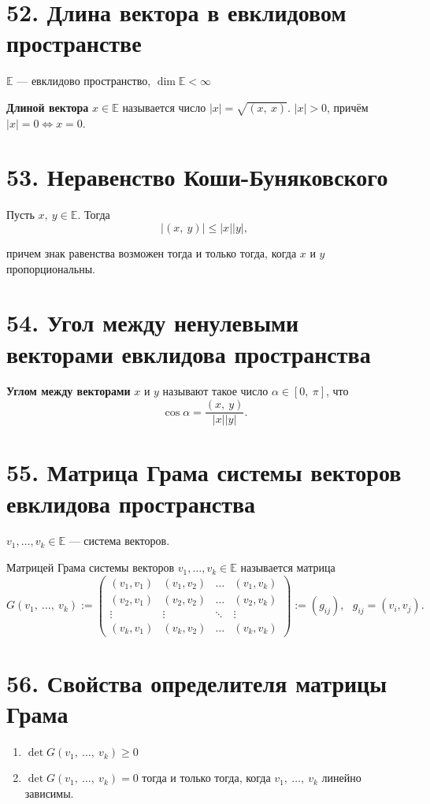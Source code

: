 \documentclass[a4paper, 12pt]{article}
\newcommand{\E}{\mathbb{E}}
\begin{document}
\section*{52. Длина вектора в евклидовом пространстве}
$\E$ --- евклидово пространство, $\dim\E < \infty$

\textbf{Длиной вектора} $x \in \E$ называется число $|x| = \sqrt{(x,\ x)}$. $|x| > 0$, причём $|x| = 0 \Longleftrightarrow x = 0$.

\section*{53. Неравенство Коши-Буняковского}
Пусть $x,\ y \in \E$. Тогда 
\[
|(x,\ y)| \leqslant |x||y|,
\]

причем знак равенства возможен тогда и только тогда, когда $x$ и $y$ пропорциональны.

\section*{54. Угол между ненулевыми векторами евклидова пространства}
\textbf{Углом между векторами} $x$ и $y$ называют такое число $\alpha \in [0,\ \pi]$, что
\vspace{-2mm}
\[
\cos\alpha = \dfrac{(x,\ y)}{|x||y|}.
\]
\newpage
\section*{55. Матрица Грама системы векторов евклидова пространства}
$v_1, \ldots, v_k \in \E$ --- система векторов.

Матрицей Грама системы векторов $v_1, \ldots, v_k \in \E$ называется матрица
\[
G(v_1,\ \ldots,\ v_k) :=
\begin{pmatrix}
(v_1, v_1) & (v_1, v_2) & \ldots & (v_1, v_k) \\
(v_2, v_1) & (v_2, v_2) & \ldots & (v_2, v_k) \\
\vdots     & \vdots     & \ddots & \vdots     \\
(v_k, v_1) & (v_k, v_2) & \ldots & (v_k, v_k)
\end{pmatrix} := (g_{ij}),\ \ \ g_{ij} = (v_i, v_j).
\]

\section*{56. Свойства определителя матрицы Грама}
\begin{enumerate}
    \itemsep=-0.3em
    \item $\det G(v_1,\ \ldots,\ v_k) \geqslant 0$
    \item $\det G(v_1,\ \ldots,\ v_k) = 0$ тогда и только тогда, когда $v_1,\ \ldots,\ v_k$ линейно зависимы.
\end{enumerate}
\end{document}
